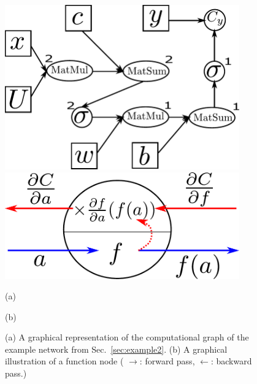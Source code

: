 \documentclass{report}
\begin{document}
\begin{figure}[ht]
    \centering
    \begin{minipage}{0.48\textwidth}
        \centering
        \includegraphics[width=0.9\textwidth]{figures/comp_graph.pdf}
    \end{minipage}
    \hfill
    \begin{minipage}{0.48\textwidth}
        \centering
        \includegraphics[width=0.9\textwidth]{figures/comp_node.pdf}
    \end{minipage}

    \begin{minipage}{0.48\textwidth}
        \centering
        (a)
    \end{minipage}
    \hfill
    \begin{minipage}{0.48\textwidth}
        \centering
        (b)
    \end{minipage}
    \caption{(a) A graphical representation of the computational graph of the
    example network from Sec.~\ref{sec:example2}. (b) A graphical illustration
    of a function node ({\color{blue} $\to$}: forward pass, {\color{red}
$\leftarrow$}: backward pass.)}
    \label{fig:comp_graph}
\end{figure}
\end{document}

